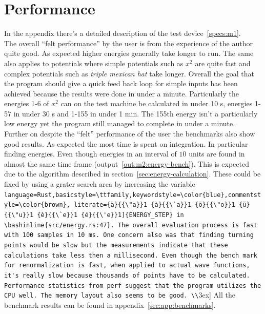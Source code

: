 \documentclass[11pt,DIV=10,final]{scrreprt} %
\providecommand{\rustinline}{\lstinline[language=Rust,basicstyle=\ttfamily,keywordstyle=\color{blue},commentstyle=\color{brown}, literate={ä}{{\"a}}1 {à}{{\`a}}1 {ö}{{\"o}}1 {ü}{{\"u}}1 {è}{{\`e}}1 {é}{{\'e}}1]} % für Inline-C++ Code
\providecommand{\bashinline}{\lstinline[language=bash,basicstyle=\ttfamily,keywordstyle=\color{blue},commentstyle=\color{brown}, literate={ä}{{\"a}}1 {à}{{\`a}}1 {ö}{{\"o}}1 {ü}{{\"u}}1 {è}{{\`e}}1 {é}{{\'e}}1]} % für Inline-C++ Code
\begin{document}
\section{Performance}
In the appendix there's a detailed description of the test device~\ref{specs:m1}.
\\[3ex]
The overall ``felt performance'' by the user is from the experience of the author quite good. As
expected higher energies generally take longer to run. The same also applies to potentials where simple potentials such as $x^{2}$ are quite fast and complex potentials such as \emph{triple mexican hat}
take longer. Overall the goal that the program should give a quick feed back loop for simple inputs has been achieved because the results were done in under a minute. Particularly the energies 1-6 of
$x^{2}$ can on the test machine be calculated in under 10 s, energies 1-57 in under 30 s and 1-155 in under 1 min. The 155th energy isn't a particularly low energy yet the program still managed to
complete in under a minute.
\\[3ex]
Further on despite the ``felt'' performance of the user the benchmarks also show good results. As expected the most time is spent on integration. In particular finding energies. Even though energies in
an interval of $10$ units are found in almost the same time frame (output~\ref{out:m2:energy-bench}). This is expected due to the algorithm described in section~\ref{sec:energy-calculation}. These could
be fixed by using a grater search area by increasing the variable \rustinline{ENERGY_STEP} in \bashinline{src/energy.rs:47}. The overall evaluation process is fast with 100 samples in 10 ms. One concern
also was that finding turning points would be slow but the measurements indicate that these calculations take less then a millisecond. Even though the bench mark for renormalization is fast, when applied
to actual wave functions, it's really slow because thousands of points have to be calculated.

Performance statistics from perf suggest that the program utilizes the CPU well. The memory layout also seems to be good.
\\[3ex]
All the benchmark results can be found in appendix~\ref{sec:app:benchmarks}.
\end{document}
